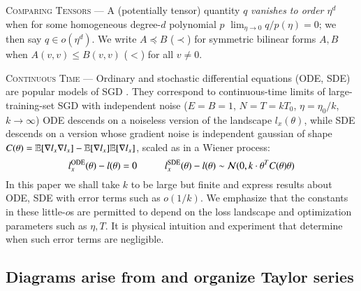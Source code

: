 
            \textsc{Comparing Tensors} --- A (potentially tensor)
            quantity $q$ \emph{vanishes to order $\eta^d$} when
            for some homogeneous degree-$d$ polynomial $p$
            $\lim_{\eta\to 0} q/p(\eta) = 0$; we then say $q\in o(\eta^d)$.
            We write $A \preceq B$ ($\prec$) for symmetric bilinear forms $A,
            B$ when $A(v,v) \leq B(v,v)$ ($<$) for all $v\neq 0$. 

\textsc{Continuous Time} ---
                Ordinary and stochastic differential equations (ODE, SDE) are
                popular models of SGD \citep{li18, ba21}.  They correspond to
                continuous-time limits of large-training-set SGD with
                independent noise ($E=B=1$, $N=T=kT_0$, $\eta=\eta_0/k$, $k\to
                \infty$) ODE descends on a noiseless version of the landscape
                $l_x(\theta)$, while SDE descends on a version whose gradient
                noise is independent gaussian of shape $C(\theta) =
                \mathbb{E}[\nabla l_x \nabla l_x] - \mathbb{E}[\nabla l_x] \mathbb{E}[\nabla
                l_x]$, scaled as in a Wiener process:
                $$
                    l^{\text{ODE}}_x(\theta) - l(\theta) = 0
                    \hspace{1cm}
                    l^{\text{SDE}}_x(\theta) - l(\theta)
                        \sim \mathcal{N}(0, k\cdot \theta^T C(\theta)\theta)
                $$
                In this paper we shall take $k$ to be large but finite and
                express results about ODE, SDE with error terms such as
                $o(1/k)$.  We emphasize that the constants in these little-$o$s
                are permitted to depend on the loss landscape and optimization
                parameters such as $\eta, T$.  It is physical intuition and
                experiment that determine when such error terms are negligible.

\subsection{Diagrams arise from and organize Taylor series}\label{sect:challenges}
        \label{sect:using}\label{sect:diagrams}



